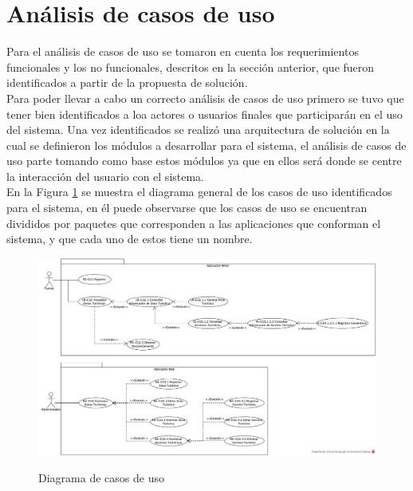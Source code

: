 


\newpage
\section{Análisis de casos de uso}
Para el análisis de casos de uso se tomaron en cuenta los requerimientos funcionales y los no funcionales, descritos en la sección anterior, que fueron identificados a partir de la propuesta de solución. \\

Para poder llevar a cabo un correcto análisis de casos de uso primero se tuvo que tener bien identificados a loa actores o usuarios finales que participarán en el uso del sistema. Una vez identificados se realizó una arquitectura de solución en la cual se definieron los módulos a desarrollar para el sistema, el análisis de casos de uso parte tomando como base estos módulos ya que en ellos será donde se centre la interacción del usuario con el sistema. \\

En la Figura \ref{fig:casosDeUso} se muestra el diagrama general de los casos de uso identificados para el sistema, en él puede observarse que los casos de uso se encuentran divididos por paquetes que corresponden a las aplicaciones que conforman el sistema, y que cada uno de estos tiene un nombre.


\hypertarget{fig:casosDeUso}{
	\begin{figure}[htbp]
		\begin{center}
			\hypertarget{fig:casosDeUso}{
				\includegraphics[angle=90, scale=.4]{casosDeUso/images/DiagramaDeCasosDeUso}
				\caption{Diagrama de casos de uso}
			}
			\label{fig:casosDeUso}
		\end{center}
	\end{figure}
}

